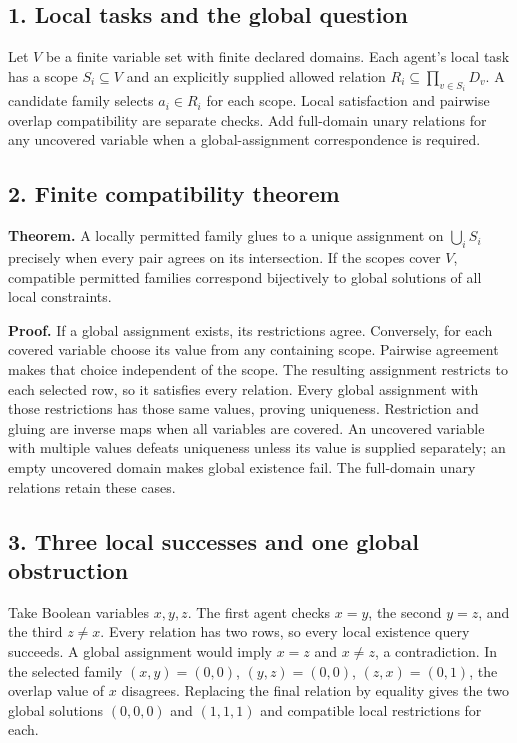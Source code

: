 \documentclass[
  11pt,
]{article}
\begin{document}
\subsection{1. Local tasks and the global
question}\label{local-tasks-and-the-global-question}

Let \(V\) be a finite variable set with finite declared domains. Each
agent's local task has a scope \(S_i\subseteq V\) and an explicitly
supplied allowed relation \(R_i\subseteq\prod_{v\in S_i}D_v\). A
candidate family selects \(a_i\in R_i\) for each scope. Local
satisfaction and pairwise overlap compatibility are separate checks. Add
full-domain unary relations for any uncovered variable when a
global-assignment correspondence is required.

\subsection{2. Finite compatibility
theorem}\label{finite-compatibility-theorem}

\textbf{Theorem.} A locally permitted family glues to a unique
assignment on \(\bigcup_i S_i\) precisely when every pair agrees on its
intersection. If the scopes cover \(V\), compatible permitted families
correspond bijectively to global solutions of all local constraints.

\textbf{Proof.} If a global assignment exists, its restrictions agree.
Conversely, for each covered variable choose its value from any
containing scope. Pairwise agreement makes that choice independent of
the scope. The resulting assignment restricts to each selected row, so
it satisfies every relation. Every global assignment with those
restrictions has those same values, proving uniqueness. Restriction and
gluing are inverse maps when all variables are covered. An uncovered
variable with multiple values defeats uniqueness unless its value is
supplied separately; an empty uncovered domain makes global existence
fail. The full-domain unary relations retain these cases.

\subsection{3. Three local successes and one global
obstruction}\label{three-local-successes-and-one-global-obstruction}

Take Boolean variables \(x,y,z\). The first agent checks \(x=y\), the
second \(y=z\), and the third \(z\ne x\). Every relation has two rows,
so every local existence query succeeds. A global assignment would imply
\(x=z\) and \(x\ne z\), a contradiction. In the selected family
\((x,y)=(0,0)\), \((y,z)=(0,0)\), \((z,x)=(0,1)\), the overlap value of
\(x\) disagrees. Replacing the final relation by equality gives the two
global solutions \((0,0,0)\) and \((1,1,1)\) and compatible local
restrictions for each.
\end{document}
